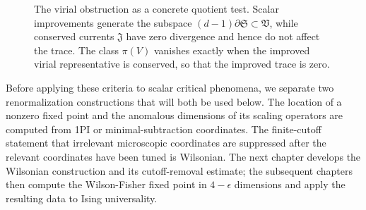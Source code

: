 \begin{figure}[H]
{
  }
  \caption{The virial obstruction as a concrete quotient test.  Scalar
  improvements generate the subspace
  \((d-1)\partial\mathfrak S\subset\mathfrak V\), while conserved currents
  \(\mathfrak J\) have zero divergence and hence do not affect the trace.
  The class \(\pi(V)\) vanishes exactly when the improved virial representative
  is conserved, so that the improved trace is zero.}
  \label{fig:volume-ii-virial-improvement}
\end{figure}

Before applying these criteria to scalar critical phenomena, we separate two
renormalization constructions that will both be used below.  The location of a
nonzero fixed point and the anomalous dimensions of its scaling operators are
computed from 1PI or minimal-subtraction coordinates.  The finite-cutoff
statement that irrelevant microscopic coordinates are suppressed after the
relevant coordinates have been tuned is Wilsonian.  The next chapter develops
the Wilsonian construction and its cutoff-removal estimate; the subsequent
chapters then compute the Wilson-Fisher fixed point in \(4-\epsilon\)
dimensions and apply the resulting data to Ising universality.
